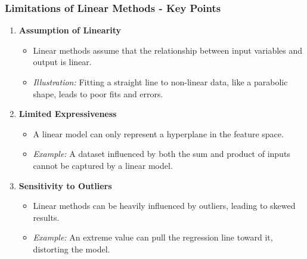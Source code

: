 \documentclass[aspectratio=169]{beamer}
\begin{document}
\begin{frame}[fragile]
    \frametitle{Limitations of Linear Methods - Key Points}
    \begin{enumerate}
        \item \textbf{Assumption of Linearity}
            \begin{itemize}
                \item Linear methods assume that the relationship between input variables and output is linear.
                \item \textit{Illustration:} Fitting a straight line to non-linear data, like a parabolic shape, leads to poor fits and errors.
            \end{itemize}
        
        \item \textbf{Limited Expressiveness}
            \begin{itemize}
                \item A linear model can only represent a hyperplane in the feature space.
                \item \textit{Example:} A dataset influenced by both the sum and product of inputs cannot be captured by a linear model.
            \end{itemize}

        \item \textbf{Sensitivity to Outliers}
            \begin{itemize}
                \item Linear methods can be heavily influenced by outliers, leading to skewed results.
                \item \textit{Example:} An extreme value can pull the regression line toward it, distorting the model.
            \end{itemize}
    \end{enumerate}
\end{frame}
\end{document}
